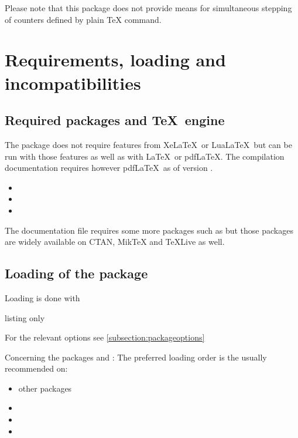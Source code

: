 \documentclass[12pt,a4paper,oneside]{article}
\def\packageversion{\xassoccntpackageversion}%
\begin{document}
Please note that this package does not provide means for simultaneous stepping of counters defined by plain \TeX{}  command.\marginnote{\bcbombe}




\section{Requirements, loading and incompatibilities}%



\subsection{Required packages and \TeX\ engine}

The package does not require features from Xe\LaTeX\ or Lua\LaTeX\ but can be run with those features as well as with \LaTeX\ or pdf\LaTeX. The compilation documentation requires however pdf\LaTeX\ as of version \packageversion. 

\begin{itemize}
\item {}  
\item {}
\item {}
\end{itemize}

The documentation file requires some more packages such as  but those packages are widely available on CTAN, MikTeX and TeXLive as well.

\subsection{Loading of the package}

Loading is done with

\begin{tcblisting}{listing only}
\usepackage[options]{xassoccnt}
\end{tcblisting}

For the relevant options see \cref{subsection:packageoptions}

Concerning the packages  and : The preferred loading order is the usually recommended on: 
\begin{itemize}
  \item other packages
  \item {}
  \item {}
  \item {}
\end{itemize}
\end{document}

